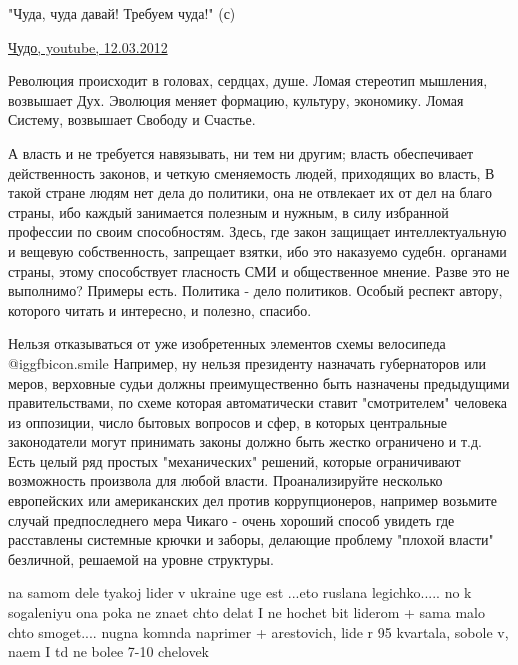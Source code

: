 \begin{itemize}

"Чуда, чуда давай! Требуем чуда!" (с)

\href{https://www.youtube.com/watch?v=s2hmqvh9TjE}{%
Чудо, youtube, 12.03.2012%
}


Революция происходит в головах, сердцах, душе. Ломая стереотип мышления,
возвышает Дух. Эволюция меняет формацию, культуру, экономику. Ломая Систему,
возвышает Свободу и Счастье.


А власть и не требуется навязывать, ни тем ни другим; власть обеспечивает
действенность законов, и четкую сменяемость людей, приходящих во власть, В
такой стране людям нет дела до политики, она не отвлекает их от дел на благо
страны, ибо каждый занимается полезным и нужным, в силу избранной профессии по
своим способностям. Здесь, где закон защищает интеллектуальную и вещевую
собственность, запрещает взятки, ибо это наказуемо судебн. органами страны,
этому способствует гласность СМИ и общественное мнение. Разве это не выполнимо?
Примеры есть. Политика - дело политиков. Особый респект автору, которого читать
и интересно, и полезно, спасибо.


Нельзя отказываться от уже изобретенных элементов схемы велосипеда  @igg{fbicon.smile}  Например,
ну нельзя президенту назначать губернаторов или меров, верховные судьи должны
преимущественно быть назначены предыдущими правительствами, по схеме которая
автоматически ставит "смотрителем" человека из оппозиции, число бытовых
вопросов и сфер, в которых центральные законодатели могут принимать законы
должно быть жестко ограничено и т.д. Есть целый ряд простых "механических"
решений, которые ограничивают возможность произвола для любой власти.
Проанализируйте несколько европейских или американских дел против
коррупционеров, например возьмите случай предпоследнего мера Чикаго - очень
хороший способ увидеть где расставлены системные крючки и заборы, делающие
проблему "плохой власти" безличной, решаемой на уровне структуры.


na samom dele tyakoj lider v ukraine uge est ...eto ruslana legichko..... no k
sogaleniyu ona poka ne znaet chto delat I ne hochet bit liderom + sama malo
chto smoget.... nugna komnda naprimer + arestovich, lide r 95 kvartala, sobole
v, naem I td ne bolee 7-10 chelovek


\end{itemize}
